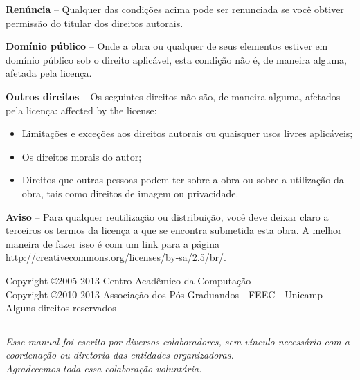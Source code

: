 \noindent
\textbf{Renúncia} -- Qualquer das condições acima pode ser renunciada se você obtiver permissão do titular dos direitos autorais.

\vspace{1em}
\noindent
\textbf{Domínio público} -- Onde a obra ou qualquer de seus elementos estiver em domínio público sob o direito aplicável, esta condição não é, de maneira alguma, afetada pela licença.

\vspace{1em}
\noindent
\textbf{Outros direitos} -- Os seguintes direitos não são, de maneira alguma, afetados pela licença: 
affected by the license:

\begin{itemize}
\item Limitações e exceções aos direitos autorais ou quaisquer usos livres aplicáveis;
\item Os direitos morais do autor;
\item Direitos que outras pessoas podem ter sobre a obra ou sobre a utilização da obra, tais como direitos de imagem ou privacidade.
\end{itemize}

\vspace{1em}
\noindent
\textbf{Aviso} -- Para qualquer reutilização ou distribuição, você deve deixar claro a terceiros os termos da licença a que se encontra submetida esta obra. A melhor maneira de fazer isso é com um link para a página \url{http://creativecommons.org/licenses/by-sa/2.5/br/}.

\begin{center}
Copyright \copyright 2005-2013 Centro Acadêmico da Computação \\
Copyright \copyright 2010-2013 Associação dos Pós-Graduandos - FEEC - Unicamp \\
Alguns direitos reservados

\vspace{1em}
\rule{\linewidth}{0.5mm}
\vspace{1em}

\emph{Esse manual foi escrito por diversos colaboradores, sem vínculo necessário com a coordenação ou diretoria das entidades organizadoras. \\
Agradecemos toda essa colaboração voluntária.}
\end{center}

\clearpage

\thispagestyle{empty}